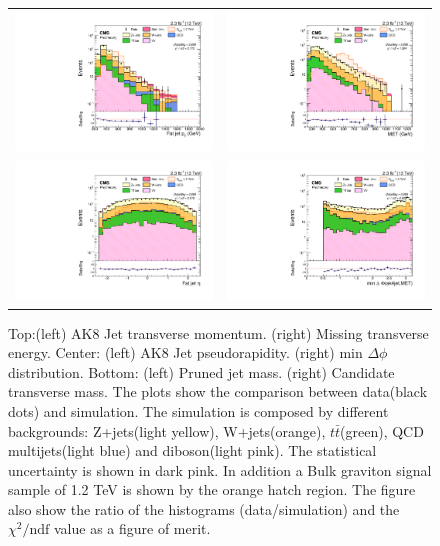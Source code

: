 \begin{figure}[!ht]
\caption{Top:(left) AK8 Jet transverse momentum. (right) Missing transverse energy. Center: (left) AK8 Jet pseudorapidity. (right) min $\Delta \phi$ distribution. Bottom: (left) Pruned jet mass. (right) Candidate transverse mass. The plots show the comparison between data(black dots) and simulation. The simulation is composed by different backgrounds: Z+jets(light yellow), W+jets(orange), $t\bar{t}$(green), QCD multijets(light blue) and diboson(light pink). The statistical uncertainty is shown in dark pink. In addition a Bulk graviton signal sample of 1.2 TeV is shown by the orange hatch region. The figure also show the ratio of the histograms (data/simulation) and the $\chi^{2}/\text{ndf}$ value as a figure of merit.}
\begin{tabular}{cc}
  \includegraphics[width=180pt]{Chapter6_plots/LOG_can_h_ptZjj.pdf} &
\includegraphics[width=180pt]{Chapter6_plots/LOG_can_h_metpt.pdf}\\
\includegraphics[width=180pt]{Chapter6_plots/LOG_can_h_yZjj.pdf} &
\includegraphics[width=180pt]{Chapter6_plots/LOG_can_h_minabsdeltaphi.pdf}\\

\end{tabular}
\end{figure}
